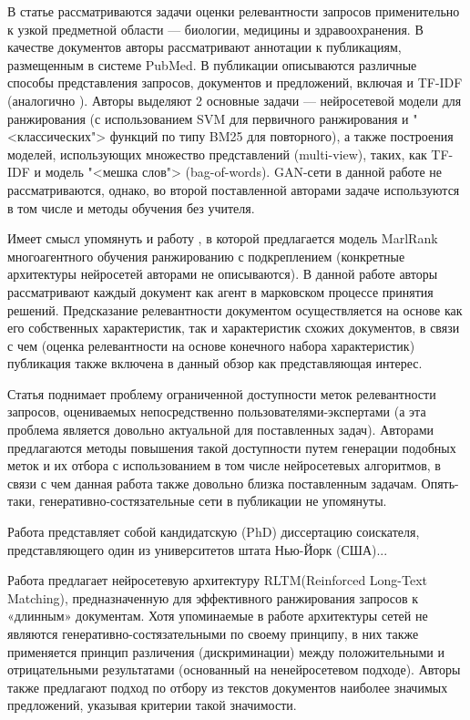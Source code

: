 В статье \cite{DBLP:journals/corr/abs-1910-00314} рассматриваются задачи оценки релевантности запросов применительно к узкой
предметной области --- биологии, медицины и здравоохранения. В качестве документов авторы рассматривают аннотации к публикациям,
размещенным в системе PubMed. В публикации описываются различные способы представления запросов, документов и предложений, включая
и TF-IDF (аналогично \cite{DBLP:journals/corr/abs-2001-09896}). Авторы выделяют 2 основные задачи --- нейросетевой модели для
ранжирования (с использованием SVM для первичного ранжирования и "<классических"> функций по типу BM25 для повторного), а также
построения моделей, использующих множество представлений (multi-view), таких, как TF-IDF и модель "<мешка слов"> (bag-of-words).
GAN-сети в данной работе не рассматриваются, однако, во второй поставленной авторами задаче используются в том числе и методы
обучения без учителя.

Имеет смысл упомянуть и работу \cite{DBLP:journals/corr/abs-1909-06859}, в которой предлагается модель MarlRank многоагентного
обучения ранжированию с подкреплением (конкретные архитектуры нейросетей авторами не описываются). В данной работе авторы 
рассматривают каждый документ как агент в марковском процессе принятия решений. Предсказание релевантности документом 
осуществляется на основе как его собственных характеристик, так и характеристик схожих документов, в связи с чем (оценка 
релевантности на основе конечного набора характеристик) публикация также включена в данный обзор как представляющая интерес. 

Статья \cite{DBLP:journals/corr/abs-1907-08657} поднимает проблему ограниченной доступности меток релевантности запросов,
оцениваемых непосредственно пользователями-экспертами (а эта проблема является довольно актуальной для поставленных задач).
Авторами предлагаются методы повышения такой доступности путем генерации подобных меток и их отбора с использованием в 
том числе нейросетевых алгоритмов, в связи с чем данная работа также довольно близка поставленным задачам. Опять-таки, 
генеративно-состя\-зательные сети в публикации не упомянуты.

Работа \cite{DBLP:journals/corr/abs-1908-06132} представляет собой кандидатскую (PhD) диссертацию соискателя, представляющего
один из университетов штата Нью-Йорк (США)...

Работа \cite{DBLP:journals/corr/abs-1906-09404} предлагает нейросетевую архитектуру RLTM(Reinforced Long-Text Matching), предназначенную для эффективного 
ранжирования запросов к «длинным» документам. Хотя упоминаемые в работе архитектуры сетей не являются генеративно-состязательными
по своему принципу, в них также применяется принцип различения (дискриминации) между положительными и отрицательными результатами
(основанный на ненейросетевом подходе). Авторы также предлагают подход по отбору из текстов документов наиболее значимых
предложений, указывая критерии такой значимости. 

